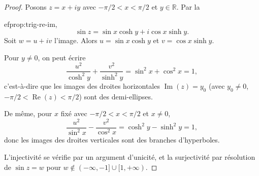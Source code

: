 \documentclass[12pt,a4paper,openany]{book}
\theoremstyle{definition}
\theoremstyle{plain}
\theoremstyle{remark}
\newcommand{\R}{\mathbb{R}}
\DeclareMathOperator{\re}{Re}
\DeclareMathOperator{\im}{Im}
\begin{document}
\begin{proof}
Posons $z = x + iy$ avec $-\pi/2 < x < \pi/2$ et $y \in \R$. Par la

ef{prop:trig-re-im},
\[
  \sin z = \sin x \cosh y + i\cos x \sinh y.
\]
Soit $w = u + iv$ l'image. Alors $u = \sin x \cosh y$ et $v = \cos x \sinh y$.

Pour $y \neq 0$, on peut écrire
\[
  \frac{u^2}{\cosh^2 y} + \frac{v^2}{\sinh^2 y}
  = \sin^2 x + \cos^2 x = 1,
\]
c'est-à-dire que les images des droites horizontales $\im(z) = y_0$ (avec $y_0 \neq 0$, $-\pi/2 < \re(z) < \pi/2$) sont des demi-ellipses.

De même, pour $x$ fixé avec $-\pi/2 < x < \pi/2$ et $x \neq 0$,
\[
  \frac{u^2}{\sin^2 x} - \frac{v^2}{\cos^2 x} = \cosh^2 y - \sinh^2 y = 1,
\]
donc les images des droites verticales sont des branches d'hyperboles.

L'injectivité se vérifie par un argument d'unicité, et la surjectivité par résolution
de $\sin z = w$ pour $w \notin (-\infty,-1] \cup [1,+\infty)$.
\end{proof}
\end{document}
